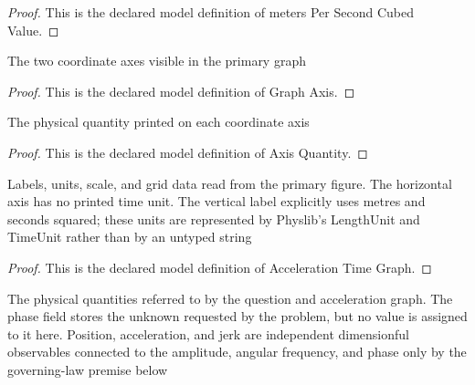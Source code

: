 \begin{proof}
  This is the declared model definition of meters Per Second Cubed Value.
\end{proof}
\begin{definition}
  \label{def:physics:phyx-mini-0277:phyxminiproblems-problemphyxmini0277-graphaxis}
  The two coordinate axes visible in the primary graph
\end{definition}
\begin{proof}
  This is the declared model definition of Graph Axis.
\end{proof}
\begin{definition}
  \label{def:physics:phyx-mini-0277:phyxminiproblems-problemphyxmini0277-axisquantity}
  The physical quantity printed on each coordinate axis
\end{definition}
\begin{proof}
  This is the declared model definition of Axis Quantity.
\end{proof}
\begin{definition}
  \label{def:physics:phyx-mini-0277:phyxminiproblems-problemphyxmini0277-accelerationtimegraph}
  Labels, units, scale, and grid data read from the primary figure. The horizontal axis has no printed time unit. The vertical label explicitly uses metres and seconds squared; these units are represented by Physlib's LengthUnit and TimeUnit rather than by an untyped string
\end{definition}
\begin{proof}
  This is the declared model definition of Acceleration Time Graph.
\end{proof}
\begin{definition}
  \label{def:physics:phyx-mini-0277:phyxminiproblems-problemphyxmini0277-accelerationgraphoscillator}
  The physical quantities referred to by the question and acceleration graph. The phase field stores the unknown requested by the problem, but no value is assigned to it here. Position, acceleration, and jerk are independent dimensionful observables connected to the amplitude, angular frequency, and phase only by the governing-law premise below
\end{definition}
